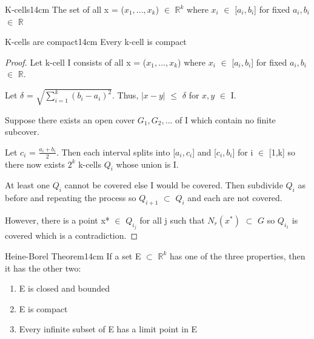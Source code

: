 	\vspace{0.5cm}


	 
	\begin{definition}{K-cells}{14cm}
		The set of all x = ($x_1, ... , x_k$) $\in$ $\mathbb{R}^k$
		where $x_i$ $\in$ [$a_i,b_i$] for fixed $a_i,b_i$ $\in$ $\mathbb{R}$ 
	\end{definition}
	
	\vspace{0.5cm}



	\begin{wtheorem}{K-cells are compact}{14cm}
		Every k-cell is compact
	\end{wtheorem}
	
	\begin{proof}
		Let k-cell I consists of all x = ($x_1, ... , x_k$) where
		$x_i$ $\in$ [$a_i,b_i$] for fixed $a_i,b_i$ $\in$ $\mathbb{R}$.

		Let $\delta$ = $\sqrt{\sum_{i=1}^{k} (b_i - a_i)^2}$.
		Thus, $|x-y|$ $\leq$ $\delta$ for $x,y$ $\in$ I.

		Suppose there exists an open cover $G_1, G_2, ...$ of I which
		contain no finite subcover.

		Let $c_i$ = $\frac{a_i+b_i}{2}$.
		Then each interval splits into [$a_i,c_i$] and [$c_i,b_i$]
		for i $\in$ [1,k] so there now exists $2^k$ k-cells $Q_i$
		whose union is I.

		At least one $Q_i$ cannot be covered else I would be covered.
		Then subdivide $Q_i$ as before and repeating the process
		so $Q_{i+1}$ $\subset$ $Q_i$ and each are not covered.

		However, there is a point x* $\in$ $Q_{i_j}$ for all j
		such that $N_r(x^*)$ $\subset$ $G$ so $Q_{i_1}$ is covered
		which is a contradiction.
	\end{proof}

	\newpage



	\begin{wtheorem}{Heine-Borel Theorem}{14cm}
		If a set E $\subset$ $\mathbb{R}^k$ has one of the three properties,
		then it has the other two:
	\end{wtheorem}

	\begin{enumerate}[label=(\alph*), leftmargin=2cm, itemsep=0.1cm]
		\item E is closed and bounded
		\item E is compact
		\item Every infinite subset of E has a limit point in E
	\end{enumerate}

